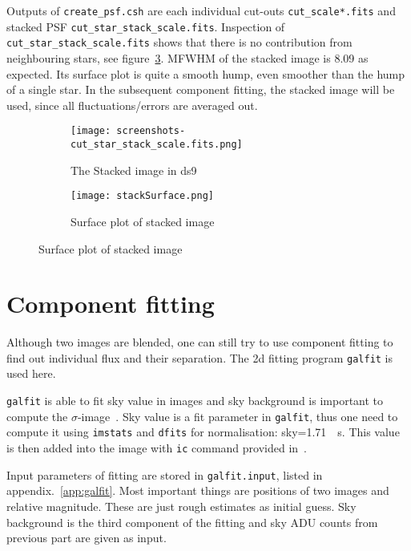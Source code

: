 Outputs of \verb|create_psf.csh| are each individual cut-outs \verb|cut_scale*.fits| and stacked PSF \verb|cut_star_stack_scale.fits|. Inspection of \verb|cut_star_stack_scale.fits| shows that there is no contribution from neighbouring stars, see figure~\ref{fig:stackSurface}. MFWHM of the stacked image is \num{8.09} as expected. Its surface plot is quite a smooth hump, even smoother than the hump of a single star. In the subsequent component fitting, the stacked image will be used, since all fluctuations/errors are averaged out.
\begin{figure}[ht]
	\begin{subfigure}[t]{0.5\textwidth}
	\begin{center}
		\texttt{[image: screenshots-cut\_star\_stack\_scale.fits.png]}
	\end{center}
	\caption{The Stacked image in ds9}%
	\label{fig:stackScrenn}
	\end{subfigure}%
	\centering
	\begin{subfigure}[t]{0.5\textwidth}
	\begin{center}
	\texttt{[image: stackSurface.png]}
	\end{center}
	\caption{Surface plot of stacked image}%
	\label{fig:stackSurface}
	\end{subfigure}
\end{figure}

\clearpage
\section{Component fitting}
Although two images are blended, one can still try to use component fitting to find out individual flux and their separation. The 2d fitting program \verb|galfit| is used here.

\verb|galfit| is able to fit sky value in images and sky background is important to compute the $\sigma$-image~\cite{galfitManual}. Sky value is a fit parameter in \verb|galfit|, thus one need to compute it using \verb|imstats| and \verb|dfits| for normalisation: sky=\SI{1.71}{\per\s}. This value is then added into the image with \verb|ic| command provided in~\cite{manual}.

Input parameters of fitting are stored in \verb|galfit.input|, listed in appendix.~\ref{app:galfit}. Most important things are positions of two images and relative magnitude. These are just rough estimates as initial guess. Sky background is the third component of the fitting and sky ADU counts from previous part are given as input.

